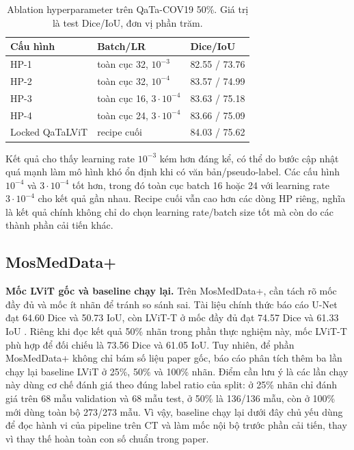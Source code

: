 \begin{table}[H]
  \centering
  \caption{Ablation hyperparameter trên QaTa-COV19 50\%. Giá trị là test Dice/IoU, đơn vị phần trăm.}
  \label{tab:hp-ablation}
  \scriptsize
  \renewcommand{\arraystretch}{1.12}
  \setlength{\tabcolsep}{4pt}
  \begin{tabularx}{\columnwidth}{@{}l Y Y@{}}
    \toprule
    Cấu hình & Batch/LR & Dice/IoU \\
    \midrule
    HP-1 & toàn cục 32, \(10^{-3}\) & 82.55 / 73.76 \\
    HP-2 & toàn cục 32, \(10^{-4}\) & 83.57 / 74.99 \\
    HP-3 & toàn cục 16, \(3\cdot10^{-4}\) & 83.63 / 75.18 \\
    HP-4 & toàn cục 24, \(3\cdot10^{-4}\) & 83.66 / 75.09 \\
    Locked QaTaLViT & recipe cuối & 84.03 / 75.62 \\
    \bottomrule
  \end{tabularx}
\end{table}
\FloatBarrier

Kết quả cho thấy learning rate \(10^{-3}\) kém hơn đáng kể, có thể do bước cập nhật quá mạnh làm mô hình khó ổn định khi có văn bản/pseudo-label. Các cấu hình \(10^{-4}\) và \(3\cdot10^{-4}\) tốt hơn, trong đó toàn cục batch 16 hoặc 24 với learning rate \(3\cdot10^{-4}\) cho kết quả gần nhau. Recipe cuối vẫn cao hơn các dòng HP riêng, nghĩa là kết quả chính không chỉ do chọn learning rate/batch size tốt mà còn do các thành phần cải tiến khác.

\FloatBarrier

\subsection{MosMedData+}

\textbf{Mốc LViT gốc và baseline chạy lại.} Trên MosMedData+, cần tách rõ mốc đầy đủ và mốc ít nhãn để tránh so sánh sai. Tài liệu chính thức báo cáo U-Net đạt 64.60 Dice và 50.73 IoU, còn LViT-T ở mốc đầy đủ đạt 74.57 Dice và 61.33 IoU \cite{lvitOfficialRepo}. Riêng khi đọc kết quả 50\% nhãn trong phần thực nghiệm này, mốc LViT-T phù hợp để đối chiếu là 73.56 Dice và 61.05 IoU. Tuy nhiên, để phần MosMedData+ không chỉ bám số liệu paper gốc, báo cáo phân tích thêm ba lần chạy lại baseline LViT ở 25\%, 50\% và 100\% nhãn. Điểm cần lưu ý là các lần chạy này dùng cơ chế đánh giá theo đúng label ratio của split: ở 25\% nhãn chỉ đánh giá trên 68 mẫu validation và 68 mẫu test, ở 50\% là 136/136 mẫu, còn ở 100\% mới dùng toàn bộ 273/273 mẫu. Vì vậy, baseline chạy lại dưới đây chủ yếu dùng để đọc hành vi của pipeline trên CT và làm mốc nội bộ trước phần cải tiến, thay vì thay thế hoàn toàn con số chuẩn trong paper.

